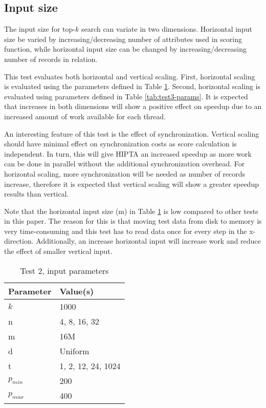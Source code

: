 \subsection{Input size}

The input size for top-$k$ search can variate in two dimensions.
Horizontal input size be varied by increasing/decreasing number of
attributes used in scoring function, while horizontal input size can
be changed by increasing/decreasing number of records in relation.

This test evaluates both horizontal and vertical scaling. First,
horizontal scaling is evaluated using the parameters defined in Table
\ref{tab:test2-params}. Second, horizontal scaling is evaluated using
parameters defined in Table \ref{tab:test3-params}. It is expected
that increases in both dimensions will show a positive effect on
speedup due to an increased amount of work available for each thread.

An interesting feature of this test is the effect of synchronization.
Vertical scaling should have minimal effect on synchronization costs
as score calculation is independent. In turn, this will give HIPTA an
increased speedup as more work can be done in parallel without the
additional synchronization overhead. For horizontal scaling, more
synchronization will be needed as number of records increase,
therefore it is expected that vertical scaling will show a greater
speedup results than vertical.

Note that the horizontal input size (m) in Table
\ref{tab:test2-params} is low compared to other tests in this paper.
The reason for this is that moving test data from disk to memory is
very time-consuming and this test has to read data once for every step
in the x-direction. Additionally, an increase horizontal input will
increase work and reduce the effect of smaller vertical input.

\begin{table}[H]
	\centering
	\begin{tabular}{|l|l|}
	\hline
	Parameter & Value(s) \\ \hline
	$k$ & 1000 \\
	n & 4, 8, 16, 32\\
	m & 16M\\
	d & Uniform\\
	t & 1, 2, 12, 24, 1024\\
	$p_{min}$ & 200\\
	$p_{max}$ & 400 \\
	\hline
	\end{tabular}
	\caption{Test 2, input parameters}
	\label{tab:test2-params}
\end{table}

